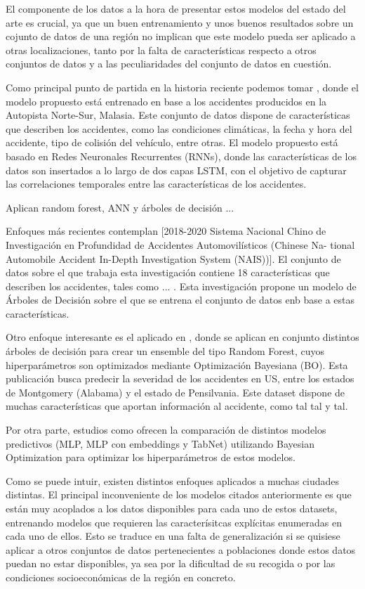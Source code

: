 \documentclass{uathesis-es}
\begin{document}
El componente de los datos a la hora de presentar estos modelos del estado del arte es crucial, ya que un buen entrenamiento y unos buenos resultados sobre un cojunto de datos de una región no implican que este modelo pueda ser aplicado a otras localizaciones, tanto por la falta de características respecto a otros conjuntos de datos y a las peculiaridades del conjunto de datos en cuestión.


Como principal punto de partida en la historia reciente podemos tomar \cite{app7060476}, donde el modelo propuesto está entrenado en base a los accidentes producidos en la Autopista Norte-Sur, Malasia. Este conjunto de datos dispone de características que describen los accidentes, como las condiciones climáticas, la fecha y hora del accidente, tipo de colisión del vehículo, entre otras. El modelo propuesto está basado en Redes Neuronales Recurrentes (RNNs), donde las características de los datos son insertados a lo largo de dos capas LSTM, con el objetivo de capturar las correlaciones temporales entre las características de los accidentes.

Aplican random forest, ANN y árboles de decisión \cite{app10010129}...


Enfoques más recientes contemplan \cite{Yang2023} [2018-2020 Sistema Nacional Chino de Investigación en Profundidad de Accidentes Automovilísticos (Chinese Na- tional Automobile Accident In-Depth Investigation System (NAIS))]. El conjunto de datos sobre el que trabaja esta investigación contiene 18 características que describen los accidentes, tales como ... . Esta investigación propone un modelo de Árboles de Decisión sobre el que se entrena el conjunto de datos enb base a estas características.

Otro enfoque interesante es el aplicado en \cite{su14031729}, donde se aplican en conjunto distintos árboles de decisión para crear un ensemble del tipo Random Forest, cuyos hiperparámetros son optimizados mediante Optimización Bayesiana (BO). Esta publicación busca predecir la severidad de los accidentes en US, entre los estados de Montgomery (Alabama) y el estado de Pensilvania. Este dataset dispone de muchas características que aportan información al accidente, como tal tal y tal.

Por otra parte, estudios como \cite{Sattar2023} ofrecen la comparación de distintos modelos predictivos (MLP, MLP con embeddings y TabNet) utilizando Bayesian Optimization para optimizar los hiperparámetros de estos modelos.

Como se puede intuir, existen distintos enfoques aplicados a muchas ciudades distintas. El principal inconveniente de los modelos citados anteriormente es que están muy acoplados a los datos disponibles para cada uno de estos datasets, entrenando modelos que requieren las caracterísitcas explícitas enumeradas en cada uno de ellos. Esto se traduce en una falta de generalización si se quisiese aplicar a otros conjuntos de datos pertenecientes a poblaciones donde estos datos puedan no estar disponibles, ya sea por la dificultad de su recogida o por las condiciones socioeconómicas de la región en concreto.
\end{document}
